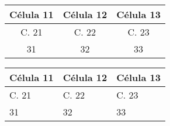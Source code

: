 \documentclass[a4paper,12pt]{article}
\begin{document}
	
	
	\linhabase\hfill
	\begin{tabular}[c]{|c|c|c|}
		\hline
		Célula 11 & Célula 12 & Célula 13 \\
		\hline
		C. 21     & C. 22     & C. 23     \\
		\hline
		31        & 32        & 33        \\
		\hline
	\end{tabular}%
	\hfill\null
	
	
	\linhabase\hfill
	\begin{tabular}[c]{|p{35mm}|p{35mm}|p{35mm}|}
		\hline
		Célula 11 & Célula 12 & Célula 13 \\
		\hline
		C. 21     & C. 22     & C. 23     \\
		\hline
		31        & 32        & 33        \\
		\hline
	\end{tabular}%
	\hfill\null
	
\end{document}
